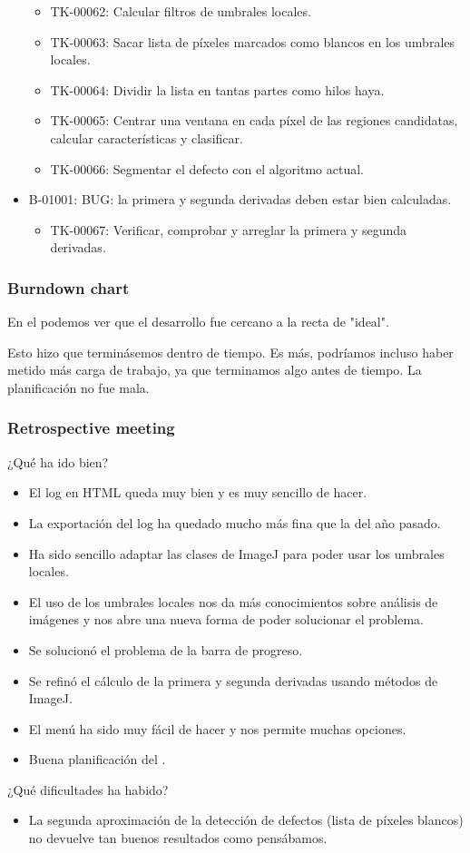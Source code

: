 \begin{itemize}
  \begin{itemize}
   \item TK-00062: Calcular filtros de umbrales locales.
   \item TK-00063: Sacar lista de píxeles marcados como blancos en los umbrales locales.
   \item TK-00064: Dividir la lista en tantas partes como hilos haya.
   \item TK-00065: Centrar una ventana en cada píxel de las regiones candidatas, calcular características y clasificar.
   \item TK-00066: Segmentar el defecto con el algoritmo actual.
  \end{itemize}
 \item B-01001: BUG: la primera y segunda derivadas deben estar bien calculadas.
  \begin{itemize}
   \item TK-00067: Verificar, comprobar y arreglar la primera y segunda derivadas.
  \end{itemize}
\end{itemize}

\subsubsection*{Burndown chart}
En el \burndownchart{}  podemos ver que el desarrollo fue cercano a la recta de "ideal".


Esto hizo que terminásemos dentro de tiempo. Es más, podríamos incluso haber metido más carga de trabajo, ya que terminamos algo antes de tiempo. La planificación no fue mala.

\subsubsection*{Retrospective meeting}
¿Qué ha ido bien?
\begin{itemize}
 \item El log en HTML queda muy bien y es muy sencillo de hacer.
 \item La exportación del log ha quedado mucho más fina que la del año pasado.
 \item Ha sido sencillo adaptar las clases de ImageJ para poder usar los umbrales locales.
 \item El uso de los umbrales locales nos da más conocimientos sobre análisis de imágenes y nos abre una nueva forma de poder solucionar el problema.
 \item Se solucionó el problema de la barra de progreso.
 \item Se refinó el cálculo de la primera y segunda derivadas usando métodos de ImageJ.
 \item El menú ha sido muy fácil de hacer y nos permite muchas opciones.
 \item Buena planificación del \sprint{}.
\end{itemize}

¿Qué dificultades ha habido?
\begin{itemize}
 \item La segunda aproximación de la detección de defectos (lista de píxeles blancos) no devuelve tan buenos resultados como pensábamos.
\end{itemize}
